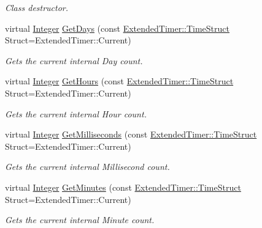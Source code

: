 \begin{DoxyCompactItemize}
\begin{DoxyCompactList}\small\item\em Class destructor. \item\end{DoxyCompactList}\item 
virtual \hyperlink{namespaceMezzanine_ac3576e52af3c62d13dde94829e0c5465}{Integer} \hyperlink{classMezzanine_1_1ExtendedTimer_a293364cf175ba95addaa06bbb43d1d3b}{GetDays} (const \hyperlink{classMezzanine_1_1ExtendedTimer_a52119e2da54ea7ae5da0dc1f921a3b61}{ExtendedTimer::TimeStruct} Struct=ExtendedTimer::Current)
\begin{DoxyCompactList}\small\item\em Gets the current internal Day count. \item\end{DoxyCompactList}\item 
virtual \hyperlink{namespaceMezzanine_ac3576e52af3c62d13dde94829e0c5465}{Integer} \hyperlink{classMezzanine_1_1ExtendedTimer_a8e4f14bee3434fd93a6df6a4798165a9}{GetHours} (const \hyperlink{classMezzanine_1_1ExtendedTimer_a52119e2da54ea7ae5da0dc1f921a3b61}{ExtendedTimer::TimeStruct} Struct=ExtendedTimer::Current)
\begin{DoxyCompactList}\small\item\em Gets the current internal Hour count. \item\end{DoxyCompactList}\item 
virtual \hyperlink{namespaceMezzanine_ac3576e52af3c62d13dde94829e0c5465}{Integer} \hyperlink{classMezzanine_1_1ExtendedTimer_ab2c087c96c4c0bc4bbe3bb6e029fa88e}{GetMilliseconds} (const \hyperlink{classMezzanine_1_1ExtendedTimer_a52119e2da54ea7ae5da0dc1f921a3b61}{ExtendedTimer::TimeStruct} Struct=ExtendedTimer::Current)
\begin{DoxyCompactList}\small\item\em Gets the current internal Millisecond count. \item\end{DoxyCompactList}\item 
virtual \hyperlink{namespaceMezzanine_ac3576e52af3c62d13dde94829e0c5465}{Integer} \hyperlink{classMezzanine_1_1ExtendedTimer_af70a43d4735bcc7d05401607c1f63784}{GetMinutes} (const \hyperlink{classMezzanine_1_1ExtendedTimer_a52119e2da54ea7ae5da0dc1f921a3b61}{ExtendedTimer::TimeStruct} Struct=ExtendedTimer::Current)
\begin{DoxyCompactList}\small\item\em Gets the current internal Minute count. \item\end{DoxyCompactList}\item 

\end{DoxyCompactItemize}
